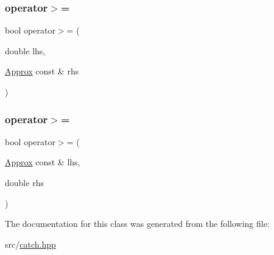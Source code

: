 \mbox{\label{class_catch_1_1_detail_1_1_approx_a4e60095c615a0e6bdd6e8663cd24090b}} 
\subsubsection{\texorpdfstring{operator$>$=}{operator>=}\hspace{0.1cm}{\footnotesize\ttfamily [1/2]}}
{\footnotesize\ttfamily bool operator$>$= (\begin{DoxyParamCaption}\item[{double}]{lhs,  }\item[{\hyperlink{class_catch_1_1_detail_1_1_approx}{Approx} const \&}]{rhs }\end{DoxyParamCaption})\hspace{0.3cm}{\ttfamily [friend]}}

\mbox{\label{class_catch_1_1_detail_1_1_approx_adaba11ee9aabb4d51d4855f09aa7f7df}} 
\subsubsection{\texorpdfstring{operator$>$=}{operator>=}\hspace{0.1cm}{\footnotesize\ttfamily [2/2]}}
{\footnotesize\ttfamily bool operator$>$= (\begin{DoxyParamCaption}\item[{\hyperlink{class_catch_1_1_detail_1_1_approx}{Approx} const \&}]{lhs,  }\item[{double}]{rhs }\end{DoxyParamCaption})\hspace{0.3cm}{\ttfamily [friend]}}



The documentation for this class was generated from the following file\+:\begin{DoxyCompactItemize}
\item 
src/\hyperlink{catch_8hpp}{catch.\+hpp}\end{DoxyCompactItemize}
